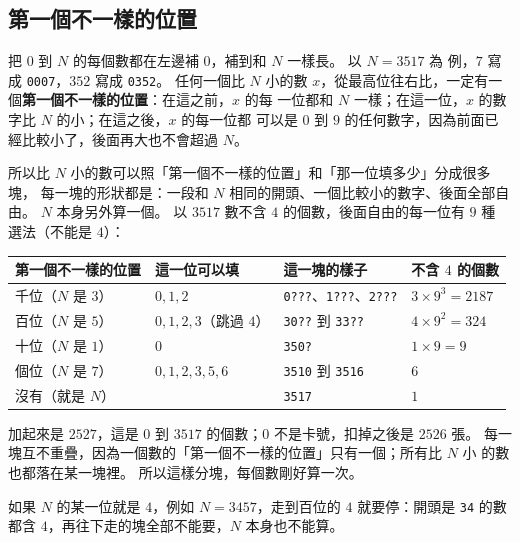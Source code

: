 \subsection{第一個不一樣的位置}

把 $0$ 到 $N$ 的每個數都在左邊補 $0$，補到和 $N$ 一樣長。 以 $N = 3517$ 為
例，$7$ 寫成 \texttt{0007}，$352$ 寫成 \texttt{0352}。 任何一個比 $N$ 小的數
$x$，從最高位往右比，一定有一個\textbf{第一個不一樣的位置}：在這之前，$x$ 的每
一位都和 $N$ 一樣；在這一位，$x$ 的數字比 $N$ 的小；在這之後，$x$ 的每一位都
可以是 $0$ 到 $9$ 的任何數字，因為前面已經比較小了，後面再大也不會超過 $N$。

所以比 $N$ 小的數可以照「第一個不一樣的位置」和「那一位填多少」分成很多塊，
每一塊的形狀都是：一段和 $N$ 相同的開頭、一個比較小的數字、後面全部自由。
$N$ 本身另外算一個。 以 $3517$ 數不含 $4$ 的個數，後面自由的每一位有 $9$ 種
選法（不能是 $4$）：

\begin{center}
\begin{tabular}{llll}
\toprule
第一個不一樣的位置 & 這一位可以填 & 這一塊的樣子 & 不含 $4$ 的個數 \\
\midrule
千位（$N$ 是 $3$） & $0, 1, 2$ & \texttt{0???}、\texttt{1???}、\texttt{2???} & $3 \times 9^3 = 2187$ \\
百位（$N$ 是 $5$） & $0, 1, 2, 3$（跳過 $4$） & \texttt{30??} 到 \texttt{33??} & $4 \times 9^2 = 324$ \\
十位（$N$ 是 $1$） & $0$ & \texttt{350?} & $1 \times 9 = 9$ \\
個位（$N$ 是 $7$） & $0, 1, 2, 3, 5, 6$ & \texttt{3510} 到 \texttt{3516} & $6$ \\
沒有（就是 $N$） & & \texttt{3517} & $1$ \\
\bottomrule
\end{tabular}
\end{center}

加起來是 $2527$，這是 $0$ 到 $3517$ 的個數；$0$ 不是卡號，扣掉之後是 $2526$
張。 每一塊互不重疊，因為一個數的「第一個不一樣的位置」只有一個；所有比 $N$ 小
的數也都落在某一塊裡。 所以這樣分塊，每個數剛好算一次。

如果 $N$ 的某一位就是 $4$，例如 $N = 3457$，走到百位的 $4$ 就要停：開頭是
\texttt{34} 的數都含 $4$，再往下走的塊全部不能要，$N$ 本身也不能算。

